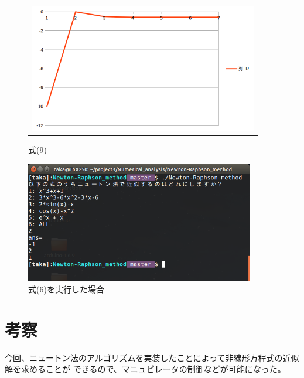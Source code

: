 \documentclass{jsarticle}
\begin{document}
\begin{figure}[htbp]
    \begin{center}
        \begin{tabular}{c}

            \begin{minipage}{0.33\hsize}
                \begin{center}
                    \includegraphics[bb=0 0 605 340, width=10cm]{5.png}
                    \caption{式(9)}
                \end{center}
            \end{minipage}

        \end{tabular}
        \label{fig:lena}
    \end{center}
\end{figure}

\begin{figure}
    \centering
    \includegraphics[bb=0 0 632 334, width=10cm]{11.png}
    \caption{式(6)を実行した場合}
\end{figure}

\section{考察}
今回、ニュートン法のアルゴリズムを実装したことによって非線形方程式の近似解を求めることが
できるので、マニュピレータの制御などが可能になった。
\end{document}
